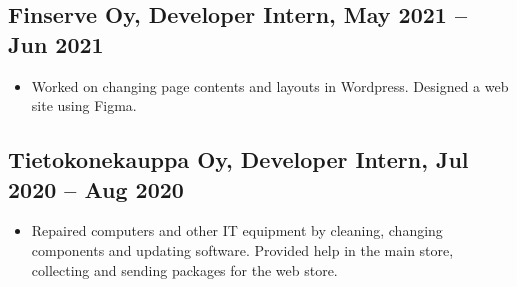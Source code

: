 \documentclass[a4paper,10pt]{article}
\begin{document}
\subsection*{Finserve Oy, Developer Intern, May 2021 -- Jun 2021}
\begin{itemize}
    \item Worked on changing page contents and layouts in Wordpress. Designed a web site using Figma.
\end{itemize}
\subsection*{Tietokonekauppa Oy, Developer Intern, Jul 2020 -- Aug 2020}
\begin{itemize}
    \item Repaired computers and other IT equipment by cleaning, changing components and updating software. Provided help in the main store, collecting and sending packages for the web store.
\end{itemize}
\end{document}
